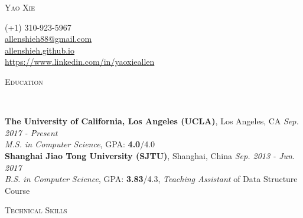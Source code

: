 \documentclass[10pt]{article}
\newenvironment{changemargin}[2]{%
  \begin{list}{}{%
    \setlength{\topsep}{0pt}%
    \setlength{\leftmargin}{#1}%
    \setlength{\rightmargin}{#2}%
    \setlength{\listparindent}{\parindent}%
    \setlength{\itemindent}{\parindent}%
    \setlength{\parsep}{\parskip}%
  }%
  \item[]}{\end{list}
}
\newcommand{\lineover}{
	\begin{changemargin}{-0.05in}{-0.05in}
		\vspace*{-8pt}
		\hrulefill \\
		\vspace*{-2pt}
	\end{changemargin}
}
\newcommand{\header}[1]{
	\begin{changemargin}{-0.7in}{-0.65in}
		\scshape{\large{#1}}\\
  	\lineover
	\end{changemargin}
}
\newenvironment{body} {
	\vspace*{-16pt}
	\begin{changemargin}{-0.65in}{-0.62in}
  }	
	{\end{changemargin}
}
\newcommand{\contactx}[5]{
		\begin{changemargin}{-0.8in}{-0.94in}
		\noindent \lettrine[lines=4]{
			\smallskip \fontsize{32}{32}\selectfont \scshape{#1}}{}
	\end{changemargin}
	\begin{changemargin}{-0.5in}{-0.6in}
			\begin{flushright} 
				{#2}\\ \smallskip
				\href{mailto:#3}{#3}\\ \smallskip
				\url{#4}\\ \smallskip
				\url{#5}\\ \smallskip
			\end{flushright}
	\end{changemargin}
}
\begin{document}
\contactx{Yao Xie}{(+1) 310-923-5967}{allenshieh88@gmail.com}{allenshieh.github.io}{https://www.linkedin.com/in/yaoxieallen}


\smallskip
\vspace{-4pt}

\header{Education}

\begin{body}
	\vspace{14pt}

	\textbf{The University of California, Los Angeles (UCLA)}, Los Angeles, CA \hfill \emph{Sep. 2017 - Present}{} \\
	\emph{M.S. in Computer Science}, GPA: \textbf{4.0}/4.0 \\
	
	
	\vspace{4pt}
	\textbf{Shanghai Jiao Tong University (SJTU)}, Shanghai, China \hfill \emph{Sep. 2013 - Jun. 2017}{} \\
	\emph{B.S. in Computer Science}, GPA: \textbf{3.83}/4.3, \textit{Teaching Assistant} of Data Structure Course \\
	
	
	
\end{body}

\smallskip
\vspace{-4pt}

\header{Technical Skills}
\end{document}
